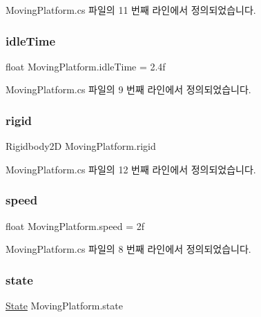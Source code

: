 Moving\+Platform.\+cs 파일의 11 번째 라인에서 정의되었습니다.

\mbox{\label{class_moving_platform_a489629e7e4703ea543f2931265d7fc2d}} 
\subsubsection{\texorpdfstring{idleTime}{idleTime}}
{\footnotesize\ttfamily float Moving\+Platform.\+idle\+Time = 2.\+4f}



Moving\+Platform.\+cs 파일의 9 번째 라인에서 정의되었습니다.

\mbox{\label{class_moving_platform_a724607bdb66234b3b0760c8d27cc143d}} 
\subsubsection{\texorpdfstring{rigid}{rigid}}
{\footnotesize\ttfamily Rigidbody2D Moving\+Platform.\+rigid}



Moving\+Platform.\+cs 파일의 12 번째 라인에서 정의되었습니다.

\mbox{\label{class_moving_platform_adf2e0e70bbc8733f8a4e8992ce2447da}} 
\subsubsection{\texorpdfstring{speed}{speed}}
{\footnotesize\ttfamily float Moving\+Platform.\+speed = 2f}



Moving\+Platform.\+cs 파일의 8 번째 라인에서 정의되었습니다.

\mbox{\label{class_moving_platform_a145ecedbfee379139ca60f04ecfe7d18}} 
\subsubsection{\texorpdfstring{state}{state}}
{\footnotesize\ttfamily \mbox{\hyperlink{class_moving_platform_af3735076efde22951ec5f5fed6123acc}{State}} Moving\+Platform.\+state}



